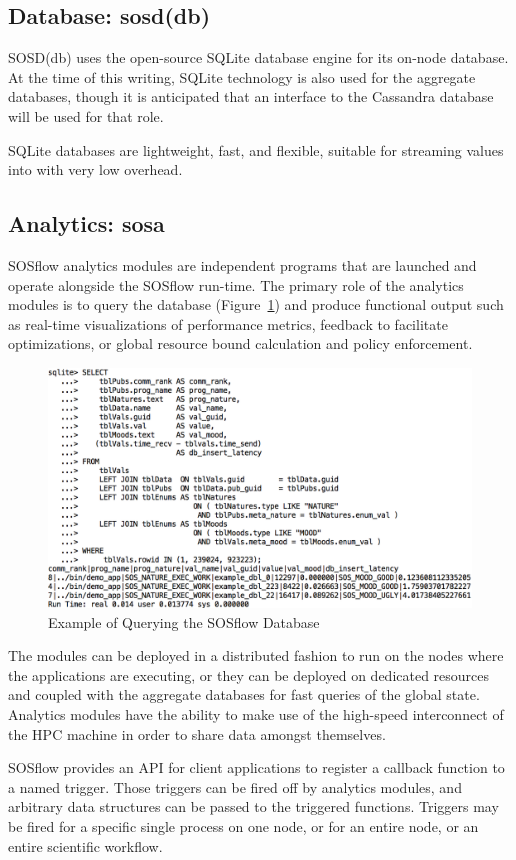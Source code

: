 \subsection{Database: sosd(db)} %
%
SOSD(db) uses the open-source SQLite database engine for its on-node
database.
%
At the time of this writing, SQLite technology is also used for the
aggregate databases, though it is anticipated that an interface to the
Cassandra database will be used for that role.
%
\par
%
SQLite databases are lightweight, fast, and flexible, suitable for
streaming values into with very low overhead.


\subsection{Analytics: sosa} %
%
SOSflow analytics modules are independent programs that are launched
and operate alongside the SOSflow run-time.
%
The primary role of the analytics modules is to query the database
(Figure~\ref{example_query}) and produce functional output such as
real-time visualizations of performance metrics, feedback to
facilitate optimizations, or global resource bound calculation and
policy enforcement.
%
\begin{figure}[h]
\centering
\includegraphics[width=\columnwidth]{images/query_example.png}
\caption{Example of Querying the SOSflow Database}
\label{example_query}
\end{figure}
%
The modules can be deployed in a distributed fashion to run on the nodes
where the applications are executing, or they can be deployed on dedicated
resources and coupled with the aggregate databases for fast queries
of the global state.
%
Analytics modules have the ability to make use of the high-speed
interconnect of the HPC machine in order to share data amongst themselves.
%
\par
%
SOSflow provides an API for client applications to register
a callback function to a named trigger.
%
Those triggers can be fired off by analytics modules, and arbitrary
data structures can be passed to the triggered functions.
%
Triggers may be fired for a specific single process on one node,
or for an entire node, or an entire scientific workflow.
